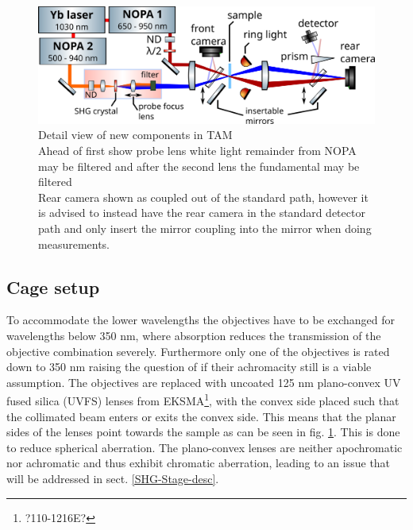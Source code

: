 \documentclass[twoside,openright]{scrreprt}
\begin{document}
\begin{figure}[h]\label{Fig:CageSetup}
\centering
\includegraphics[width=0.9\linewidth]{images/ComponentLibrary_svg/SHG-focusing-large.png}
\caption{Detail view of new components in TAM\\ Ahead of first show probe lens white light remainder from NOPA may be filtered and after the second lens the fundamental may be filtered\\
Rear camera shown as coupled out of the standard path, however it is advised to instead have the rear camera in the standard detector path and only insert the mirror coupling into the mirror when doing measurements.}
\end{figure}

\subsection{Cage setup}
To accommodate the lower wavelengths the objectives have to be exchanged for wavelengths below 350 nm, where absorption reduces the transmission of the objective combination severely. Furthermore only one of the objectives is rated down to 350 nm raising the question of if their achromacity still is a viable assumption.\newline
The objectives are replaced with  uncoated 125 nm plano-convex UV fused silica (UVFS) lenses from EKSMA\footnote{?110-1216E?}, with the convex side placed such that the collimated beam enters or exits the convex side. This means that the planar sides of the lenses point towards the sample as can be seen in fig. \protect\ref{Fig:CageSetup}. This is done to reduce spherical aberration.
\newline
The plano-convex lenses are neither apochromatic nor achromatic and thus exhibit chromatic aberration, leading to an issue that will be addressed in sect. \ref{SHG-Stage-desc}. \newline
\end{document}

